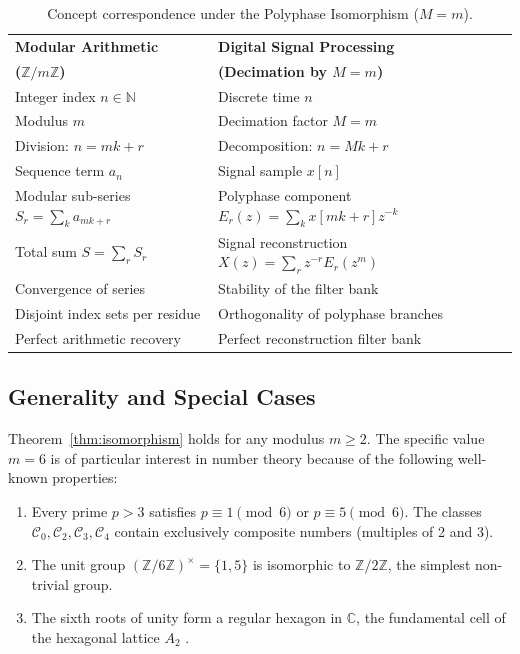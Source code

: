 \documentclass{mcom-l} %
\theoremstyle{plain} %
\theoremstyle{definition} %
\theoremstyle{remark} %
\begin{document}
\begin{table}[H]
\caption{Concept correspondence under the Polyphase Isomorphism (\(M=m\)).}
\label{tab:isomorphism}
\begin{tabular}{ll}
\toprule
\textbf{Modular Arithmetic} & \textbf{Digital Signal Processing} \\
\textbf{(\(\mathbb{Z}/m\mathbb{Z}\))} & \textbf{(Decimation by \(M=m\))} \\
\midrule
Integer index \(n \in \mathbb{N}\) & Discrete time \(n\) \\
Modulus \(m\) & Decimation factor \(M=m\) \\
Division: \(n = mk + r\) & Decomposition: \(n = M k + r\) \\
Sequence term \(a_n\) & Signal sample \(x[n]\) \\
Modular sub-series \(S_r = \sum_k a_{mk+r}\) & Polyphase component \(E_r(z) = \sum_k x[mk+r] z^{-k}\) \\
Total sum \(S = \sum_{r} S_r\) & Signal reconstruction \(X(z) = \sum_r z^{-r} E_r(z^m)\) \\
Convergence of series & Stability of the filter bank \\
Disjoint index sets per residue & Orthogonality of polyphase branches \\
Perfect arithmetic recovery & Perfect reconstruction filter bank \\
\bottomrule
\end{tabular}
\end{table}

\subsection{Generality and Special Cases}
Theorem~\ref{thm:isomorphism} holds for any modulus \(m \ge 2\). The specific value \(m=6\) is of particular interest in number theory because of the following well-known properties:

\begin{enumerate}[label=(\roman*)]
    \item Every prime \(p > 3\) satisfies \(p \equiv 1 \pmod{6}\) or \(p \equiv 5 \pmod{6}\). The classes \(\mathcal{C}_0, \mathcal{C}_2, \mathcal{C}_3, \mathcal{C}_4\) contain exclusively composite numbers (multiples of 2 and 3).
    \item The unit group \((\mathbb{Z}/6\mathbb{Z})^{\times} = \{1,5\}\) is isomorphic to \(\mathbb{Z}/2\mathbb{Z}\), the simplest non-trivial group.
    \item The sixth roots of unity form a regular hexagon in \(\mathbb{C}\), the fundamental cell of the hexagonal lattice \(A_2\) \cite{conway1999sphere}.
\end{enumerate}
\end{document}

